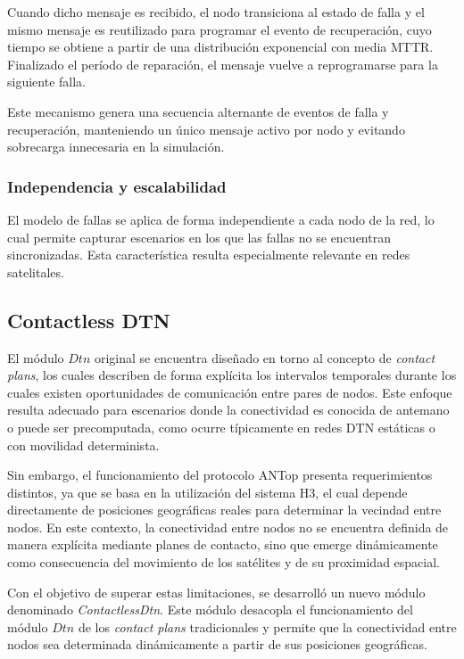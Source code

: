 Cuando dicho mensaje es recibido, el nodo transiciona al estado de falla y el mismo mensaje es reutilizado para programar el evento de recuperación, cuyo tiempo se obtiene a partir de una distribución exponencial con media MTTR. Finalizado el período de reparación, el mensaje vuelve a reprogramarse para la siguiente falla.

Este mecanismo genera una secuencia alternante de eventos de falla y recuperación, manteniendo un único mensaje activo por nodo y evitando sobrecarga innecesaria en la simulación.

\subsubsection{Independencia y escalabilidad}

El modelo de fallas se aplica de forma independiente a cada nodo de la red, lo cual permite capturar escenarios en los que las fallas no se encuentran sincronizadas. Esta característica resulta especialmente relevante en redes satelitales.

\subsection{Contactless DTN}

El módulo $Dtn$ original se encuentra diseñado en torno al concepto de \textit{contact plans}, los cuales describen de forma explícita los intervalos temporales durante los cuales existen oportunidades de comunicación entre pares de nodos. Este enfoque resulta adecuado para escenarios donde la conectividad es conocida de antemano o puede ser precomputada, como ocurre típicamente en redes DTN estáticas o con movilidad determinista.

Sin embargo, el funcionamiento del protocolo ANTop presenta requerimientos distintos, ya que se basa en la utilización del sistema H3, el cual depende directamente de posiciones geográficas reales para determinar la vecindad entre nodos. En este contexto, la conectividad entre nodos no se encuentra definida de manera explícita mediante planes de contacto, sino que emerge dinámicamente como consecuencia del movimiento de los satélites y de su proximidad espacial.

Con el objetivo de superar estas limitaciones, se desarrolló un nuevo módulo denominado \textit{ContactlessDtn}. Este módulo desacopla el funcionamiento del módulo $Dtn$ de los \textit{contact plans} tradicionales y permite que la conectividad entre nodos sea determinada dinámicamente a partir de sus posiciones geográficas.


